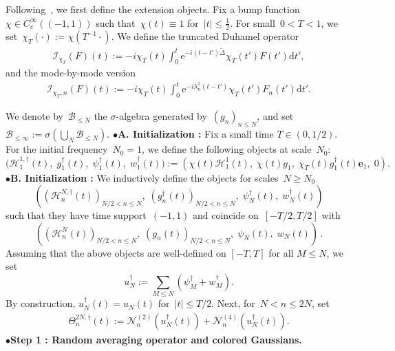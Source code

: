 \documentclass[11pt,reqno,english]{amsart}
\numberwithin{equation}{section}
\theoremstyle{plain}
\theoremstyle{definition}
\theoremstyle{remark}
\newcommand{\noi}{\noindent}
\newcommand{\e}{\mathrm{e}}
\begin{document}
Following~\cite{BCST24}, we first define the extension objects. Fix a bump function~$\chi\in C_c^{\infty}((-1,1))$ such that~$\chi(t)\equiv 1$ for~$|t|\leq \frac{1}{2}$. For small~$0<T<1$, we set~$\chi_T(\cdot):=\chi(T^{-1}\cdot)$.
We define the truncated Duhamel operator
\begin{align}\label{def:DuhamelT}
	\mathcal{I}_{\chi_T}(F)(t):=-i\chi_T(t)\int_0^t \e^{-i(t-t')\widetilde{\Delta}}\chi_T(t')F(t')\mathrm{d}t',
\end{align}
and the mode-by-mode version
\begin{align}\label{def:DuhamelTn}
	\mathcal{I}_{\chi_T,n}(F)(t):=-i\chi_T(t)\int_0^t\e^{-i\lambda_n^2(t-t')}\chi_T(t')F_n(t') \mathrm{d}t'.
\end{align}

We denote by~$\mathcal{B}_{\leq N}$ the $\sigma$-algebra generated by~$(g_n)_{n\leq N}$, and set~$\mathcal{B}_{\leq\infty}:=\sigma(\bigcup_N\mathcal{B}_{\leq N})$. 
\medskip
\noi
$\bullet${\bf A. Initialization :} 
Fix a small time $T\in(0,1/2)$. For the initial frequency~$N_0=1$, we define the following objects at scale~$N_0$:
\[
\big(\mathcal{H}_1^{1,\dag}(t),\;
g^{\dag}_1(t),\; \psi_1^{\dag}(t),\;
w_1^{\dag}(t)\big):=(\chi(t)\mathcal{H}_1^{1}(t),\; \chi(t)g_1,\; \chi_T(t)g_1^{\dag}(t)\mathbf{e}_1,\; 0 ).
\]
\medskip
$\bullet${\bf B. Initialization :} We inductively define the objects for  scales~$N\geq N_0$ 
\[
((\mathcal{H}_n^{N,\dag}(t))_{N/2<n\leq N},\; (g_n^{\dag}(t))_{N/2<n\leq N},\; \psi_N^{\dag}(t),\; w_N^{\dag}(t) )
\]
such that they have time support~$(-1,1)$ and coincide on~$[-T/2,T/2]$ with
\[
((\mathcal{H}_n^{N}(t))_{N/2<n\leq N},\; (g_n(t))_{N/2<n\leq N} ,\; \psi_N(t),\; w_N(t))\,.
\]
Assuming that the above objects are well-defined on $[-T,T]$
for all $M\leq N$, we set
\[
u_N^{\dag}:=\sum_{M\leq N}(\psi_M^{\dag}+w_M^{\dag}).
\]
By construction, $u_N^{\dag}(t) = u_N(t)$ for~$|t|\leq T/2$.
Next, for~$N<n\leq 2N$, set
\begin{align}\label{Theta2Ndag}
	\Theta_n^{2N,\dag}(t):=\mathcal{N}_n^{(2)}(u^{\dag}_{N}(t))+\mathcal{N}_n^{(4)}(u_N^{\dag}(t)).
\end{align}
\noi
$\bullet${\bf Step 1 : Random averaging operator and colored Gaussians.}
\end{document}
